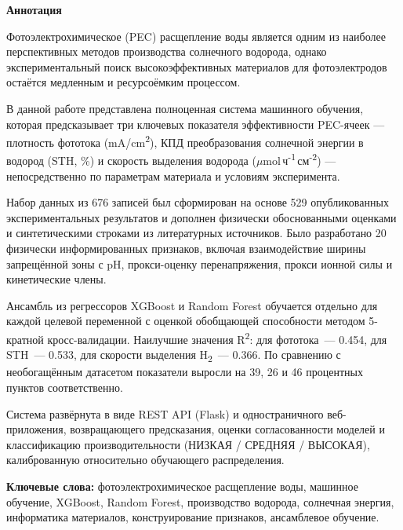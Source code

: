 \newpage
\pagestyle{plain}

{
\begin{center}
    \Large
    \textbf{Аннотация}
\end{center}

\vspace{0.5cm}

Фотоэлектрохимическое (PEC) расщепление воды является одним из наиболее перспективных
методов производства солнечного водорода, однако экспериментальный поиск
высокоэффективных материалов для фотоэлектродов остаётся медленным и ресурсоёмким
процессом.

В данной работе представлена полноценная система машинного обучения, которая предсказывает
три ключевых показателя эффективности PEC-ячеек — плотность фототока (mA/cm\textsuperscript{2}),
КПД преобразования солнечной энергии в водород (STH, \%) и скорость выделения водорода
($\mu$mol\,ч\textsuperscript{-1}\,см\textsuperscript{-2}) — непосредственно по параметрам
материала и условиям эксперимента.

Набор данных из 676 записей был сформирован на основе 529 опубликованных
экспериментальных результатов и дополнен физически обоснованными оценками и
синтетическими строками из литературных источников. Было разработано 20
физически информированных признаков, включая взаимодействие ширины запрещённой
зоны с pH, прокси-оценку перенапряжения, прокси ионной силы и кинетические члены.

Ансамбль из регрессоров XGBoost и Random Forest обучается отдельно для каждой целевой
переменной с оценкой обобщающей способности методом 5-кратной кросс-валидации.
Наилучшие значения R\textsuperscript{2}: для фототока~— 0.454, для STH~— 0.533,
для скорости выделения H\textsubscript{2}~— 0.366.
По сравнению с необогащённым датасетом показатели выросли на 39, 26 и 46
процентных пунктов соответственно.

Система развёрнута в виде REST API (Flask) и одностраничного веб-приложения,
возвращающего предсказания, оценки согласованности моделей и
классификацию производительности (НИЗКАЯ / СРЕДНЯЯ / ВЫСОКАЯ),
калиброванную относительно обучающего распределения.

\vspace{0.5cm}
\noindent\textbf{Ключевые слова:} фотоэлектрохимическое расщепление воды,
машинное обучение, XGBoost, Random Forest, производство водорода, солнечная энергия,
информатика материалов, конструирование признаков, ансамблевое обучение.
}

